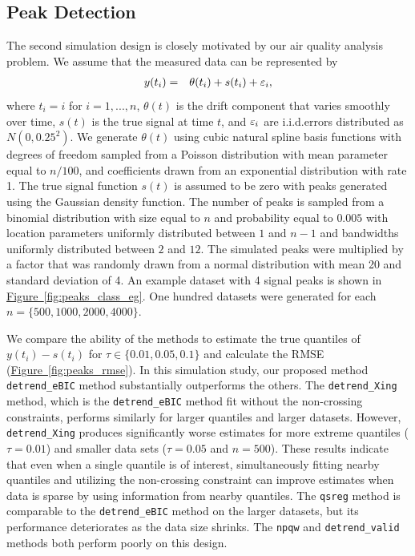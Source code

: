 \documentclass[aoas]{imsart}
\newcommand{\Fig}[1]{\hyperref[fig:#1]{Figure~\ref*{fig:#1}}} %
\newcommand{\Fig}[1]{{Figure~\ref{fig:#1}}} %
\newcommand{\VE}[2]{\MakeLowercase{#1}_{#2}} %
\begin{document}
\subsection{Peak Detection}
The second simulation design is closely motivated by our air quality analysis problem. We assume that the measured data can be represented by
\begin{eqnarray*}
	y(t_i) & = & \theta(t_i) + s(t_i) + \VE{\varepsilon}{i},
\end{eqnarray*}
where $t_i = i$ for $i = 1, ..., n$, $\theta(t)$ is the drift component that varies smoothly over time, $s(t)$ is the true signal at time $t$, and $\VE{\varepsilon}{i}$ are i.i.d.\@ errors distributed as $N(0, 0.25^2)$. We generate $\theta(t)$ using cubic natural spline basis functions with degrees of freedom sampled from a Poisson distribution with mean parameter equal to $n/100$,  and coefficients drawn from an exponential distribution with rate 1. The true signal function $s(t)$ is assumed to be zero with peaks generated using the Gaussian density function. The number of peaks is sampled from a binomial distribution with size equal to $n$ and probability equal to $0.005$ with location parameters uniformly distributed between $1$ and $n-1$ and bandwidths uniformly distributed between $2$ and $12$. The simulated peaks were multiplied by a factor that was randomly drawn from a normal distribution with mean 20 and standard deviation of 4. An example dataset with 4 signal peaks is shown in \Fig{peaks_class_eg}. One hundred datasets were generated for each $n=\{500, 1000, 2000, 4000\}$. 

We compare the ability of the methods to estimate the true quantiles of $y(t_i)-s(t_i)$  for $\tau \in \{0.01, 0.05, 0.1\}$ and calculate the RMSE (\Fig{peaks_rmse}). In this simulation study, our proposed method \texttt{detrend\_eBIC} method substantially outperforms the others. The \texttt{detrend\_Xing} method, which is the \texttt{detrend\_eBIC} method fit without the non-crossing constraints, performs similarly for larger quantiles and larger datasets. However, \texttt{detrend\_Xing} produces significantly worse estimates for more extreme quantiles ($\tau = 0.01$) and smaller data sets ($\tau = 0.05$ and $n = 500$). These results indicate that even when a single quantile is of interest, simultaneously fitting nearby quantiles and utilizing the non-crossing constraint can improve estimates when data is sparse by using information from nearby quantiles. The \texttt{qsreg} method is comparable to the \texttt{detrend\_eBIC} method on the larger datasets, but its performance deteriorates as the data size shrinks. The \texttt{npqw} and \texttt{detrend\_valid} methods both perform poorly on this design.
\end{document}
